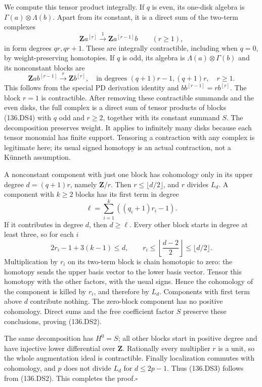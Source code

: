 We compute this tensor product integrally.  If $q$ is even, its
one-disk algebra is $\Gamma(a)\otimes\Lambda(b)$.  Apart from its
constant, it is a direct sum of the two-term complexes
\[
 \mathbf Z a^{[r]}\xrightarrow{\ 1\ }
       \mathbf Z a^{[r-1]}b\qquad(r\geq1),
\]
in form degrees $qr,qr+1$.  These are integrally contractible,
including when $q=0$, by weight-preserving homotopies.
If $q$ is odd, its algebra is $\Lambda(a)\otimes\Gamma(b)$ and
its nonconstant blocks are
\[
 \mathbf Z a b^{[r-1]}\xrightarrow{\ r\ }
       \mathbf Z b^{[r]},
 \quad\text{in degrees }(q+1)r-1,(q+1)r,
 \quad r\geq1.                                           \tag{136.DS4}
\]
This follows from the special PD derivation identity and
$b b^{[r-1]}=r b^{[r]}$.  The block $r=1$ is contractible.
After removing these contractible summands and the even disks,
the full complex is a direct sum of tensor products of blocks
(136.DS4) with $q$ odd and $r\geq2$, together with its constant
summand $S$.  The decomposition preserves weight.  It applies to
infinitely many disks because each tensor monomial has finite
support.  Tensoring a contraction with any complex is legitimate
here; its usual signed homotopy is an actual contraction, not a
K\"unneth assumption.

A nonconstant component with just one block has cohomology only
in its upper degree $d=(q+1)r$, namely $\mathbf Z/r$.  Then
$r\leq\lfloor d/2\rfloor$, and $r$ divides $L_d$.
A component with $k\geq2$ blocks has its first term in degree
\[
             \ell=\sum_{i=1}^k((q_i+1)r_i-1).
\]
If it contributes in degree $d$, then $d\geq\ell$.  Every other
block starts in degree at least three, so for each $i$
\[
 2r_i-1+3(k-1)\leq d,
 \qquad r_i\leq\left\lfloor\frac{d-2}{2}\right\rfloor
                         \leq\lfloor d/2\rfloor.
\]
Multiplication by $r_i$ on its two-term block is chain homotopic
to zero: the homotopy sends the upper basis vector to the lower
basis vector.  Tensor this homotopy with the other factors, with
the usual signs.  Hence the cohomology of the component is killed
by $r_i$, and therefore by $L_d$.  Components with first term above
$d$ contribute nothing.  The zero-block component has no positive
cohomology.  Direct sums and the free coefficient factor $S$
preserve these conclusions, proving (136.DS2).

The same decomposition has $H^0=S$; all other blocks start in
positive degree and have injective lower differential over
$\mathbf Z$.  Rationally every multiplier $r$ is a unit, so the
whole augmentation ideal is contractible.  Finally localization
commutes with cohomology, and $p$ does not divide $L_d$ for
$d\leq2p-1$.  Thus (136.DS3) follows from (136.DS2).
This completes the proof.\hfill$\square$

